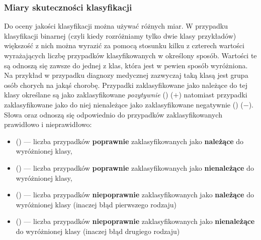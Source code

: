 \subsubsection{Miary skuteczności klasyfikacji}\label{sec:measures}
	Do oceny jakości klasyfikacji można używać różnych miar. W przypadku klasyfikacji binarnej (czyli kiedy rozróżniamy tylko dwie klasy przykładów) większość z nich można wyrazić za pomocą stosunku kilku z czterech wartości wyrażających liczbę przypadków klasyfikowanych w określony sposób. Wartości te są odnoszą się zawsze do jednej z klas, która jest w pewien sposób wyróżniona. Na przykład w przypadku diagnozy medycznej zazwyczaj taką klasą jest grupa osób chorych na jakąś chorobę. Przypadki zaklasyfikowane jako należące do tej klasy określane są jako zaklasyfikowane \textit{pozytywnie} () ($ + $) natomiast przypadki zaklasyfikowane jako do niej nienależące jako zaklasyfikowane negatywnie () ($ - $). Słowa  oraz  odnoszą się odpowiednio do przypadków zaklasyfikowanych prawidłowo i nieprawidłowo:
	\begin{itemize}
		\item {} () --- liczba przypadków \textbf{poprawnie} zaklasyfikowanych jako \textbf{należące} do wyróżnionej klasy,
		\item  {} () --- liczba przypadków \textbf{poprawnie} zaklasyfikowanych jako \textbf{nienależące} do wyróżnionej klasy,
		\item {} () --- liczba przypadków \textbf{niepoprawnie} zaklasyfikowanych jako \textbf{należące} do wyróżnionej klasy (inaczej błąd pierwszego rodzaju)
		\item {} () --- liczba przypadków \textbf{niepoprawnie} zaklasyfikowanych jako \textbf{nienależące} do wyróżnionej klasy (inaczej błąd drugiego rodzaju)
	\end{itemize}		
	

